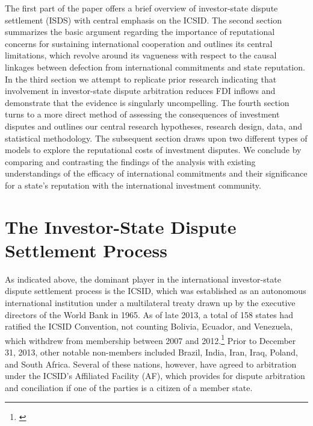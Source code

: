 \documentclass[12pt,onesided]{amsart}
\begin{document}
The first part of the paper offers a brief overview of investor-state dispute settlement (ISDS) with central emphasis on the ICSID. The second section summarizes the basic argument regarding the importance of reputational concerns for sustaining international cooperation and outlines its central limitations, which revolve around its vagueness with respect to the causal linkages between defection from international commitments and state reputation. In the third section we attempt to replicate prior research indicating that involvement in investor-state dispute arbitration reduces FDI inflows and demonstrate that the evidence is singularly uncompelling. The fourth section turns to a more direct method of assessing the consequences of investment disputes and outlines our central research hypotheses, research design, data, and statistical methodology. The subsequent section draws upon two different types of models to explore the reputational costs of investment disputes. We conclude by comparing and contrasting the findings of the analysis with existing understandings of the efficacy of international commitments and their significance for a state's reputation with the international investment community.

\section*{The Investor-State Dispute Settlement Process}

As indicated above, the dominant player in the international investor-state dispute settlement process is the ICSID, which was established as an autonomous international institution under a multilateral treaty drawn up by the executive directors of the World Bank in 1965. As of late 2013, a total of 158 states had ratified the ICSID Convention, not counting Bolivia, Ecuador, and Venezuela, which withdrew from membership between 2007 and 2012.\footnote{\citet{icsid:2014b}}  Prior to December 31, 2013, other notable non-members included Brazil, India, Iran, Iraq, Poland, and South Africa. Several of these nations, however, have agreed to arbitration under the ICSID's Affiliated Facility (AF), which provides for dispute arbitration and conciliation if one of the parties is a citizen of a member state. 

\end{document}
